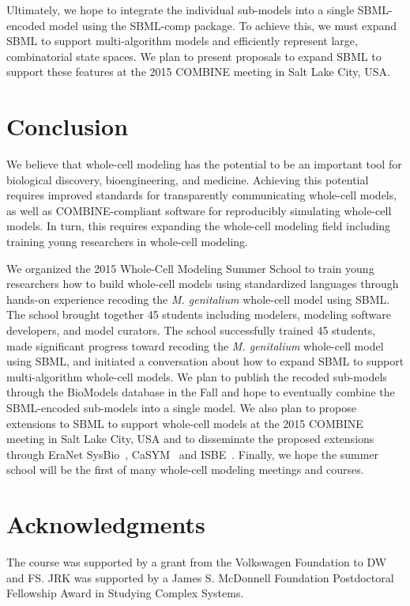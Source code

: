 \documentclass[journal,transmag]{IEEEtran}
\begin{document}
Ultimately, we hope to integrate the individual sub-models into a single SBML-encoded model using the SBML-comp package. To achieve this, we must expand SBML  to support multi-algorithm models and efficiently represent large, combinatorial state spaces. We plan to present proposals to expand SBML to support these features at the 2015 COMBINE meeting in Salt Lake City, USA.

\section{Conclusion}
We believe that whole-cell modeling has the potential to be an important tool for biological discovery, bioengineering, and medicine.
Achieving this potential requires improved standards for transparently communicating whole-cell models, as well as COMBINE-compliant software for reproducibly simulating whole-cell models.
In turn, this requires expanding the whole-cell modeling field including training young researchers in whole-cell modeling.

We organized the 2015 Whole-Cell Modeling Summer School to train young researchers how to build whole-cell models using standardized languages through hands-on experience recoding the \textit{M. genitalium} whole-cell model using SBML. 
The school brought together 45 students including modelers, modeling software developers, and model curators. 
The school successfully trained 45 students, made significant progress toward recoding the \textit{M. genitalium} whole-cell model using SBML, and initiated a conversation about how to expand SBML  to support multi-algorithm whole-cell models. 
We plan to publish the recoded sub-models through the BioModels database in the Fall and hope to eventually combine the SBML-encoded sub-models into a single model. 
We also plan to propose extensions to SBML to support whole-cell models at the 2015 COMBINE meeting in Salt Lake City, USA and to disseminate the proposed extensions through EraNet SysBio~\cite{ERASysBio2015}, CaSYM~\cite{CaSYM2015} and ISBE~\cite{Wolkenhauer2009}.
Finally, we hope the summer school will be the first of many whole-cell modeling meetings and courses.

\section*{Acknowledgments}
The course was supported by a grant from the Volkswagen Foundation to DW and FS. JRK was supported by a James S. McDonnell Foundation Postdoctoral Fellowship Award in Studying Complex Systems.
\end{document}
